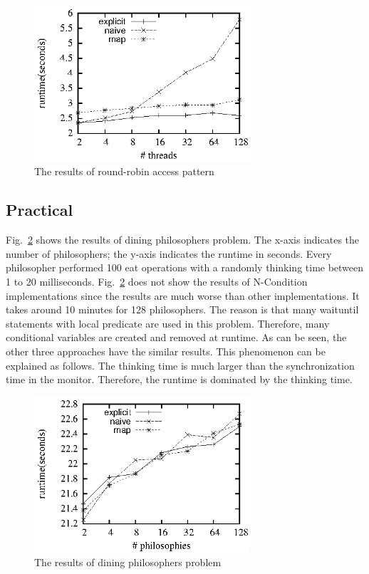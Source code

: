 \documentclass[10pt, conference, compsocconf]{IEEEtran}
\begin{document}
\begin{figure}[ht!]
  \centering
  \includegraphics[width=80mm]{fig/rr.eps}
  \caption{The results of round-robin access pattern}
  \label{fig:rr_eval}
\end{figure}

\subsection{Practical}
Fig.~\ref{fig:dp_eval} shows the results of dining philosophers problem. The
x-axis indicates the number of philosophers; the y-axis indicates the
runtime in seconds. Every philosopher performed 100 eat operations with a
randomly thinking time between 1 to 20 
milliseconds. Fig.~\ref{fig:dp_eval} does not show the results of N-Condition 
implementations since the results are much worse than other implementations. It
takes around 10 minutes for 128 philosophers. The reason is that many waituntil
statements with local predicate are used in this problem. Therefore, many
conditional variables are created and removed at runtime. As can be seen, the
other three approaches have the similar results. This phenomenon can be
explained as follows. The thinking time is much larger than the synchronization 
time in the monitor. Therefore, the runtime is dominated by the thinking time.


\begin{figure}[ht!]
  \centering
  \includegraphics[width=80mm]{fig/dp.eps}
  \caption{The results of dining philosophers problem}
  \label{fig:dp_eval}
\end{figure}
\end{document}
